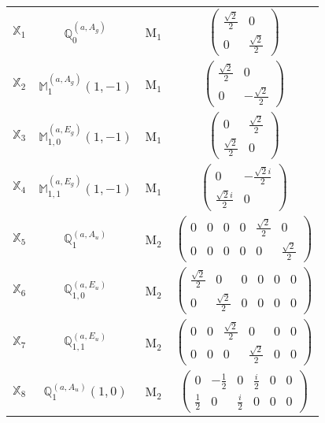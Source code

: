 \documentclass[fleqn,10pt,landscape]{article}
\begin{document}
\begin{itemize}
\begin{center}
\begin{longtable}{c|c|c|c}
$ \mathbb{X}_{1} $ & $\mathbb{Q}_{0}^{(a,A_{g})}$ & M$_{1}$ & $\begin{pmatrix} \frac{\sqrt{2}}{2} & 0 \\ 0 & \frac{\sqrt{2}}{2} \end{pmatrix}$ \\
$ \mathbb{X}_{2} $ & $\mathbb{M}_{1}^{(a,A_{g})}(1,-1)$ & M$_{1}$ & $\begin{pmatrix} \frac{\sqrt{2}}{2} & 0 \\ 0 & - \frac{\sqrt{2}}{2} \end{pmatrix}$ \\
$ \mathbb{X}_{3} $ & $\mathbb{M}_{1,0}^{(a,E_{g})}(1,-1)$ & M$_{1}$ & $\begin{pmatrix} 0 & \frac{\sqrt{2}}{2} \\ \frac{\sqrt{2}}{2} & 0 \end{pmatrix}$ \\
$ \mathbb{X}_{4} $ & $\mathbb{M}_{1,1}^{(a,E_{g})}(1,-1)$ & M$_{1}$ & $\begin{pmatrix} 0 & - \frac{\sqrt{2} i}{2} \\ \frac{\sqrt{2} i}{2} & 0 \end{pmatrix}$ \\ \hline
$ \mathbb{X}_{5} $ & $\mathbb{Q}_{1}^{(a,A_{u})}$ & M$_{2}$ & $\begin{pmatrix} 0 & 0 & 0 & 0 & \frac{\sqrt{2}}{2} & 0 \\ 0 & 0 & 0 & 0 & 0 & \frac{\sqrt{2}}{2} \end{pmatrix}$ \\
$ \mathbb{X}_{6} $ & $\mathbb{Q}_{1,0}^{(a,E_{u})}$ & M$_{2}$ & $\begin{pmatrix} \frac{\sqrt{2}}{2} & 0 & 0 & 0 & 0 & 0 \\ 0 & \frac{\sqrt{2}}{2} & 0 & 0 & 0 & 0 \end{pmatrix}$ \\
$ \mathbb{X}_{7} $ & $\mathbb{Q}_{1,1}^{(a,E_{u})}$ & M$_{2}$ & $\begin{pmatrix} 0 & 0 & \frac{\sqrt{2}}{2} & 0 & 0 & 0 \\ 0 & 0 & 0 & \frac{\sqrt{2}}{2} & 0 & 0 \end{pmatrix}$ \\
$ \mathbb{X}_{8} $ & $\mathbb{Q}_{1}^{(a,A_{u})}(1,0)$ & M$_{2}$ & $\begin{pmatrix} 0 & - \frac{1}{2} & 0 & \frac{i}{2} & 0 & 0 \\ \frac{1}{2} & 0 & \frac{i}{2} & 0 & 0 & 0 \end{pmatrix}$ \\

\end{longtable}
\end{center}
\end{itemize}
\end{document}
